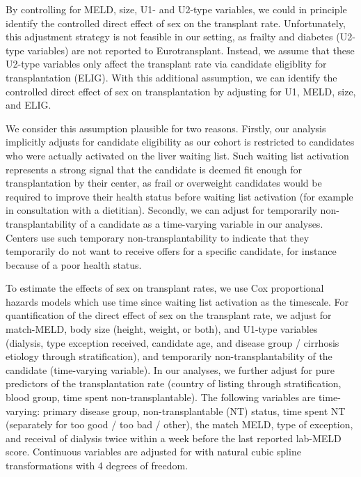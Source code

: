 \documentclass[11pt,twoside,]{book}
\begin{document}
\FloatBarrier

By controlling for MELD, size, U1- and U2-type variables, we could in principle
identify the controlled direct effect of sex on the transplant rate. Unfortunately,
this adjustment strategy is not feasible in our setting, as frailty and diabetes
(U2-type variables) are not reported to Eurotransplant. Instead, we assume that
these U2-type variables only affect the transplant rate via candidate eligiblity
for transplantation (ELIG). With this additional assumption, we can identify
the controlled direct effect of sex on transplantation by adjusting for U1,
MELD, size, and ELIG.

We consider this assumption plausible for two reasons. Firstly, our analysis
implicitly adjusts for candidate eligibility as our cohort is restricted to
candidates who were actually activated on the liver waiting list. Such waiting
list activation represents a strong signal that the candidate is deemed fit
enough for transplantation by their center, as frail or overweight candidates
would be required to improve their health status before waiting list activation
(for example in consultation with a dietitian). Secondly, we can adjust for
temporarily non-transplantability of a candidate as a time-varying variable
in our analyses. Centers use such temporary non-transplantability to indicate
that they temporarily do not want to receive offers for a specific candidate,
for instance because of a poor health status.

\newpage

To estimate the effects of sex on transplant rates, we use Cox proportional
hazards models which use time since waiting list activation as the timescale.
For quantification of the direct effect of sex on the transplant rate, we adjust
for match-MELD, body size (height, weight, or both), and U1-type variables
(dialysis, type exception received, candidate age, and disease group / cirrhosis
etiology through stratification), and temporarily non-transplantability of
the candidate (time-varying variable). In our analyses, we further
adjust for pure predictors of the transplantation
rate (country of listing through stratification, blood group, time spent non-transplantable).
The following variables are time-varying: primary disease group,
non-transplantable (NT) status, time spent NT (separately for too good / too bad / other), the match
MELD, type of exception, and receival of dialysis twice within a week before the last
reported lab-MELD score. Continuous variables are adjusted for with natural
cubic spline transformations with 4 degrees of freedom.
\end{document}
